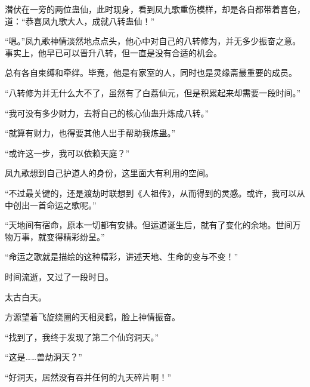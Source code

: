 \begin{this_body}
潜伏在一旁的两位蛊仙，此时现身，看到凤九歌重伤模样，却是各自都带着喜色，道：“恭喜凤九歌大人，成就八转蛊仙！”

“嗯。”凤九歌神情淡然地点点头，他心中对自己的八转修为，并无多少振奋之意。事实上，他早已可以晋升八转，但一直是没有合适的机会。

总有各自束缚和牵绊。毕竟，他是有家室的人，同时也是灵缘斋最重要的成员。

“八转修为并无什么大不了，虽然有了白荔仙元，但是积累起来却需要一段时间。”

“我可没有多少财力，去将自己的核心仙蛊升炼成八转。”

“就算有财力，也得要其他人出手帮助我炼蛊。”

“或许这一步，我可以依赖天庭？”

凤九歌想到自己护道人的身份，这里面大有利用的空间。

“不过最关键的，还是渡劫时联想到《人祖传》，从而得到的灵感。或许，我可以从中创出一首命运之歌呢。”

“天地间有宿命，原本一切都有安排。但运道诞生后，就有了变化的余地。世间万物万事，就变得精彩纷呈。”

“命运之歌就是描绘的这种精彩，讲述天地、生命的变与不变！”

时间流逝，又过了一段时日。

太古白天。

方源望着飞旋绕圈的天相灵鹤，脸上神情振奋。

“找到了，我终于发现了第二个仙窍洞天。”

“这是……兽劫洞天？”

“好洞天，居然没有吞并任何的九天碎片啊！”

\end{this_body}

